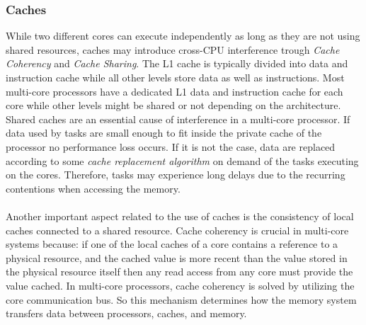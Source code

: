 \subsubsection{Caches}
While two different cores can execute independently as long as they are not using shared resources, caches may introduce cross-CPU interference trough \emph{Cache Coherency} and \emph{Cache Sharing}. The L1 cache is typically divided into data and instruction cache while all other levels store data as well as instructions. Most multi-core processors have a dedicated L1 data and instruction cache for each core while other levels might be shared or not depending on the architecture. Shared caches are an essential cause of interference in a multi-core processor. If data used by tasks are small enough to fit inside the private cache of the processor no performance loss occurs. If it is not the case, data are replaced according to some \emph{cache replacement algorithm} on demand of the tasks executing on the cores. Therefore, tasks may experience long delays due to the recurring contentions when accessing the memory.

\paragraph{} Another important aspect related to the use of caches is the consistency of local caches connected to a shared resource. Cache coherency is crucial in multi-core systems because: if one of the local caches of a core contains a reference to a physical resource, and the cached value is more recent than the value stored in the physical resource itself then any read access from any core must provide the value cached. In multi-core processors, cache coherency is solved by utilizing the core communication bus. So this mechanism determines how the memory system transfers data between processors, caches, and memory.

